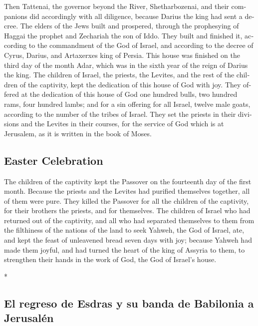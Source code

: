\begin{paracol}{2}
\begin{otherlanguage}{english}
 Then Tattenai, the governor beyond the River,
Shetharbozenai, and their companions did accordingly with all diligence,
because Darius the king had sent a decree.  The elders of
the Jews built and prospered, through the prophesying of Haggai the
prophet and Zechariah the son of Iddo. They built and finished it,
according to the commandment of the God of Israel, and according to the
decree of Cyrus, Darius, and Artaxerxes king of Persia. 
This house was finished on the third day of the month Adar, which was in
the sixth year of the reign of Darius the king.  The
children of Israel, the priests, the Levites, and the rest of the
children of the captivity, kept the dedication of this house of God with
joy.  They offered at the dedication of this house of God
one hundred bulls, two hundred rams, four hundred lambs; and for a sin
offering for all Israel, twelve male goats, according to the number of
the tribes of Israel.  They set the priests in their
divisions and the Levites in their courses, for the service of God which
is at Jerusalem, as it is written in the book of Moses.

\hypertarget{easter-celebration}{%
\subsection{Easter Celebration}\label{easter-celebration}}

 The children of the captivity kept the Passover on the
fourteenth day of the first month.  Because the priests
and the Levites had purified themselves together, all of them were pure.
They killed the Passover for all the children of the captivity, for
their brothers the priests, and for themselves.  The
children of Israel who had returned out of the captivity, and all who
had separated themselves to them from the filthiness of the nations of
the land to seek Yahweh, the God of Israel, ate,  and
kept the feast of unleavened bread seven days with joy; because Yahweh
had made them joyful, and had turned the heart of the king of Assyria to
them, to strengthen their hands in the work of God, the God of Israel's
house.

\end{otherlanguage}

\switchcolumn[0]*

\hypertarget{el-regreso-de-esdras-y-su-banda-de-babilonia-a-jerusaluxe9n}{%
\subsection{El regreso de Esdras y su banda de Babilonia a
Jerusalén}\label{el-regreso-de-esdras-y-su-banda-de-babilonia-a-jerusaluxe9n}}


\end{paracol}
